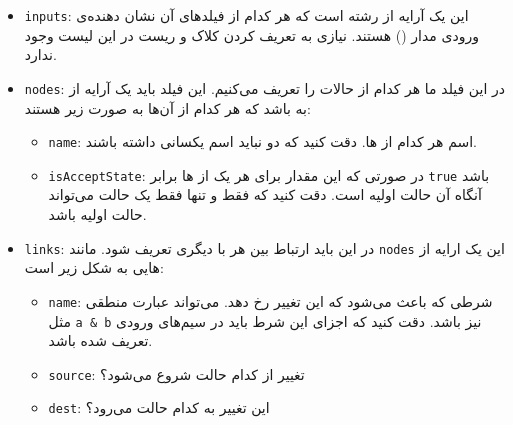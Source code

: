 \documentclass[]{article}
\begin{document}
\begin{itemize}
    \item \verb|inputs|: این یک آرایه از رشته‌ است که هر کدام از فیلد‌های آن نشان دهنده‌ی ورودی مدار () هستند. نیازی به تعریف کردن کلاک و ریست در این لیست وجود ندارد.
    \item \verb|nodes|: در این فیلد ما هر کدام از حالات  را تعریف می‌کنیم. این فیلد باید یک آرایه از  به باشد که هر کدام از آن‌ها به صورت زیر هستند:
    \begin{itemize}
        \item \verb|name|: اسم هر کدام از ها. دقت کنید که دو  نباید اسم یکسانی داشته باشند.
        \item \verb|isAcceptState|: در صورتی که این مقدار برای هر یک از ها برابر \verb|true| باشد آنگاه آن  حالت اولیه است. دقت کنید که فقط و تنها فقط یک حالت می‌تواند حالت اولیه باشد.
    \end{itemize}
    \item \verb|links|: در این  باید ارتباط بین هر  با دیگری تعریف شود. مانند \verb|nodes| این یک ارایه از هایی به شکل زیر است:
    \begin{itemize}
        \item \verb|name|: شرطی که باعث می‌شود که این تغییر  رخ دهد. می‌تواند عبارت منطقی مثل \verb|a & b| نیز باشد. دقت کنید که اجزای این شرط باید در سیم‌های ورودی تعریف شده باشد.
        \item \verb|source|: تغییر  از کدام حالت شروع می‌شود؟
        \item \verb|dest|: این تغییر  به کدام حالت می‌رود؟
    \end{itemize}
\end{itemize}
\end{document}
